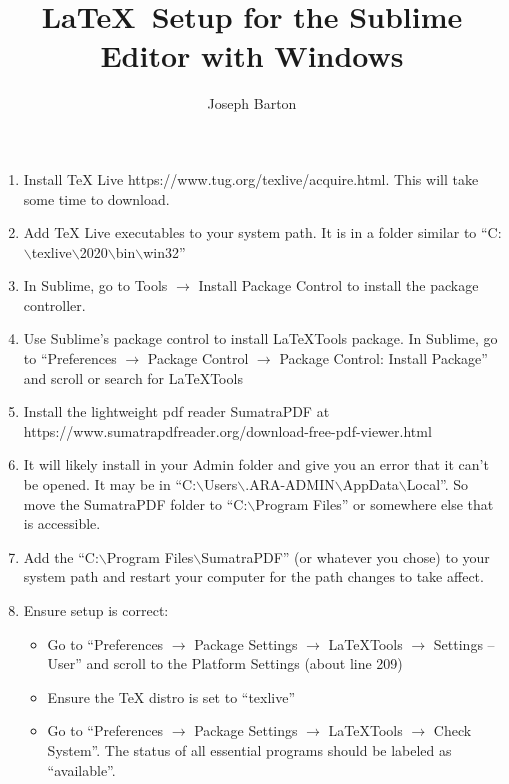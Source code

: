 \documentclass{article}
\title{\LaTeX \ Setup for the Sublime Editor with Windows}
\author{Joseph Barton}
\date{}
\begin{document}
\maketitle

\begin{enumerate}
\item Install TeX Live https://www.tug.org/texlive/acquire.html. This will take some time to download.

\item Add TeX Live executables to your system path. It is in a folder similar to ``C:$ \backslash $texlive$ \backslash $2020$ \backslash $bin$ \backslash $win32''

\item In Sublime, go to Tools $\rightarrow$ Install Package Control to install the package controller.

\item Use Sublime's package control to install LaTeXTools package. In Sublime, go to ``Preferences $\rightarrow$ Package Control $\rightarrow$ Package Control: Install Package'' and scroll or search for LaTeXTools

\item Install the lightweight pdf reader SumatraPDF at https://www.sumatrapdfreader.org/download-free-pdf-viewer.html

\item It will likely install in your Admin folder and give you an error that it can't be opened.  It may be in ``C:$ \backslash $Users$ \backslash $.ARA-ADMIN$ \backslash $AppData$ \backslash $Local''. So move the SumatraPDF folder to ``C:$ \backslash $Program Files'' or somewhere else that is accessible.

\item Add the ``C:$ \backslash $Program Files$ \backslash $SumatraPDF'' (or whatever you chose) to your system path and restart your computer for the path changes to take affect.

\item Ensure setup is correct:
	\begin{itemize}
	\item Go to ``Preferences $\rightarrow$ Package Settings $\rightarrow$ LaTeXTools $\rightarrow$ Settings -- User'' and scroll to the Platform Settings (about line 209)
	\item Ensure the TeX distro is set to ``texlive''
	\item Go to ``Preferences $\rightarrow$ Package Settings $\rightarrow$ LaTeXTools $\rightarrow$ Check System''. The status of all essential programs should be labeled as ``available''.
	\end{itemize}


\end{enumerate}
\end{document}
